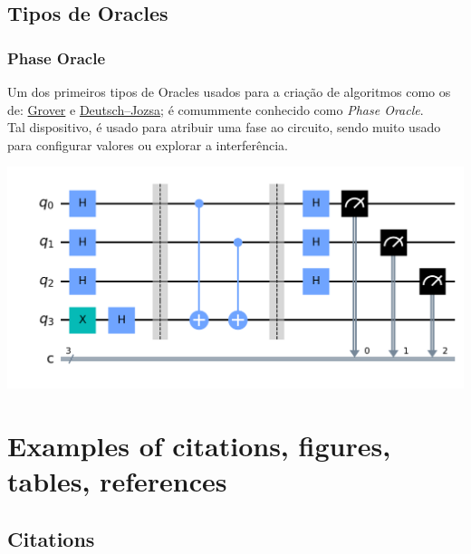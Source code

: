 \documentclass{article}
\begin{document}
\subsection{Tipos de Oracles}

\subsubsection{Phase Oracle}
Um dos primeiros tipos de Oracles usados para a criação de algoritmos como os de: \href{https://en.wikipedia.org/wiki/Grover%27s_algorithm}{Grover} e \href{https://en.wikipedia.org/wiki/Deutsch%E2%80%93Jozsa_algorithm}{Deutsch–Jozsa}; é comummente conhecido como \emph{Phase Oracle}.\\
Tal dispositivo, é usado para atribuir uma fase ao circuito, sendo muito usado para configurar valores ou explorar a interferência.

\begin{center}
	\includegraphics[scale=0.3]{phase_oracle_1.png}
	\label{fig:phase-oracle-1}
\end{center}





\section{Examples of citations, figures, tables, references}

\subsection{Citations}

\begin{center}
\end{center}



  
\end{document}
